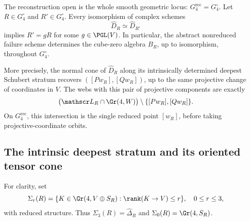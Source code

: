 \begin{theorem}
\label{thm:generic-intrinsic-web}\label{thm:smooth-intrinsic-web}
The reconstruction open is the whole smooth geometric locus:
\(G_4^{\mathrm{rec}}=G_4^\circ\).  Let \(R\in G_4^\circ\) and
\(R'\in G_4^\circ\).  Every isomorphism of complex schemes
\[
 \widehat D_R\simeq\widehat D_{R'}
\]
implies \(R'=gR\) for some \(g\in\PGL(V)\).  In particular,
the abstract nonreduced failure scheme determines the cube-zero
algebra \(B_R\), up to isomorphism, throughout \(G_4^\circ\).

More precisely, the normal cone of \(\widehat D_R\) along its
intrinsically determined deepest Schubert stratum recovers
\(([Pw_R],[Qw_R])\), up to the same projective change of coordinates
in \(V\).  The webs with this pair of projective components are
exactly
\begin{equation}\label{eq:exact-plucker-pencil}
 \bigl(\mathscr L_R\cap\Gr(4,W)\bigr)
 \setminus\{[Pw_R],[Qw_R]\}.
\end{equation}
On \(G_4^{\mathrm{rec}}\), this intersection is the single
reduced point \([w_R]\), before taking projective-coordinate
orbits.
\end{theorem}

\subsection{The intrinsic deepest stratum and its oriented tensor cone}

For clarity, set
\[
 \Sigma_r(R)=\{K\in\Gr(4,V\oplus S_R):
                    \rank(K\to V)\le r\},\quad 0\le r\le3,
\]
with reduced structure.  Thus \(\Sigma_3(R)=\widehat\Delta_R\)
and \(\Sigma_0(R)=\Gr(4,S_R)\).

